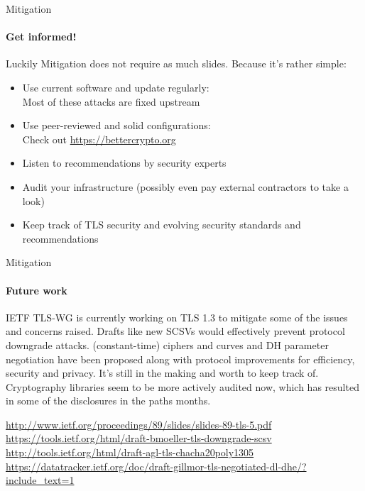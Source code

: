 \documentclass[hyperref={draft}]{beamer}
\begin{document}
\begin{frame}{Mitigation}
  \framesubtitle{Get informed!}
  Luckily Mitigation does not require as much slides. Because it's rather simple:
  \begin{itemize}
    \item Use current software and update regularly:\\
      Most of these attacks are fixed upstream
    \item Use peer-reviewed and solid configurations:\\
      Check out \url{https://bettercrypto.org}
    \item Listen to recommendations by security experts
    \item Audit your infrastructure (possibly even pay external contractors to take a look)
    \item Keep track of TLS security and evolving security standards and recommendations
  \end{itemize}
\end{frame}

\begin{frame}{Mitigation}
  \framesubtitle{Future work}
  IETF TLS-WG is currently working on TLS 1.3 to mitigate some of the issues and concerns raised. 
  \newline
  \newline
  Drafts like new SCSVs would effectively prevent protocol downgrade attacks. (constant-time) ciphers and curves and DH parameter negotiation have been proposed along with protocol improvements for efficiency, security and privacy. It's still in the making and worth to keep track of.
  \newline
  \newline
  Cryptography libraries seem to be more actively audited now, which has resulted in some of the disclosures in the paths months.

  \vspace{15px}

  \tiny
  \url{http://www.ietf.org/proceedings/89/slides/slides-89-tls-5.pdf}\\
  \url{https://tools.ietf.org/html/draft-bmoeller-tls-downgrade-scsv}\\
  \url{http://tools.ietf.org/html/draft-agl-tls-chacha20poly1305}\\
  \url{https://datatracker.ietf.org/doc/draft-gillmor-tls-negotiated-dl-dhe/?include_text=1}\\
\end{frame}
\end{document}
